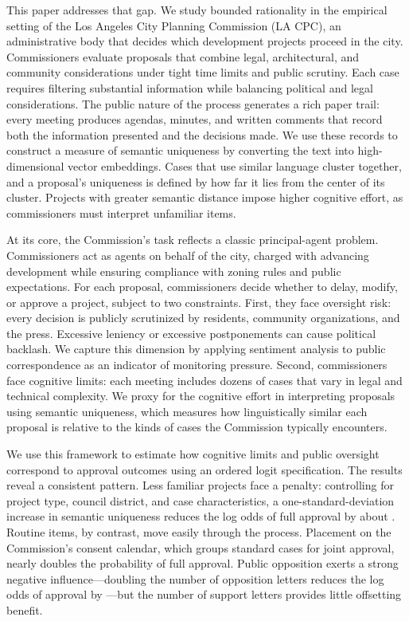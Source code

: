 This paper addresses that gap. We study bounded rationality in the empirical setting of the Los Angeles City Planning Commission (LA CPC), an administrative body that decides which development projects proceed in the city. Commissioners evaluate proposals that combine legal, architectural, and community considerations under tight time limits and public scrutiny. Each case requires filtering substantial information while balancing political and legal considerations. The public nature of the process generates a rich paper trail: every meeting produces agendas, minutes, and written comments that record both the information presented and the decisions made. We use these records to construct a measure of semantic uniqueness by converting the text into high-dimensional vector embeddings. Cases that use similar language cluster together, and a proposal's uniqueness is defined by how far it lies from the center of its cluster. Projects with greater semantic distance impose higher cognitive effort, as commissioners must interpret unfamiliar items.

At its core, the Commission's task reflects a classic principal-agent problem. Commissioners act as agents on behalf of the city, charged with advancing development while ensuring compliance with zoning rules and public expectations. For each proposal, commissioners decide whether to delay, modify, or approve a project, subject to two constraints. First, they face oversight risk: every decision is publicly scrutinized by residents, community organizations, and the press. Excessive leniency or excessive postponements can cause political backlash. We capture this dimension by applying sentiment analysis to public correspondence as an indicator of monitoring pressure. Second, commissioners face cognitive limits: each meeting includes dozens of cases that vary in legal and technical complexity. We proxy for the cognitive effort in interpreting proposals using semantic uniqueness, which measures how linguistically similar each proposal is relative to the kinds of cases the Commission typically encounters. 

We use this framework to estimate how cognitive limits and public oversight correspond to approval outcomes using an ordered logit specification. The results reveal a consistent pattern. Less familiar projects face a penalty: controlling for project type, council district, and case characteristics, a one-standard-deviation increase in semantic uniqueness reduces the log odds of full approval by about . Routine items, by contrast, move easily through the process. Placement on the Commission's consent calendar, which groups standard cases for joint approval, nearly doubles the probability of full approval. Public opposition exerts a strong negative influence---doubling the number of opposition letters reduces the log odds of approval by ---but the number of support letters provides little offsetting benefit. 

